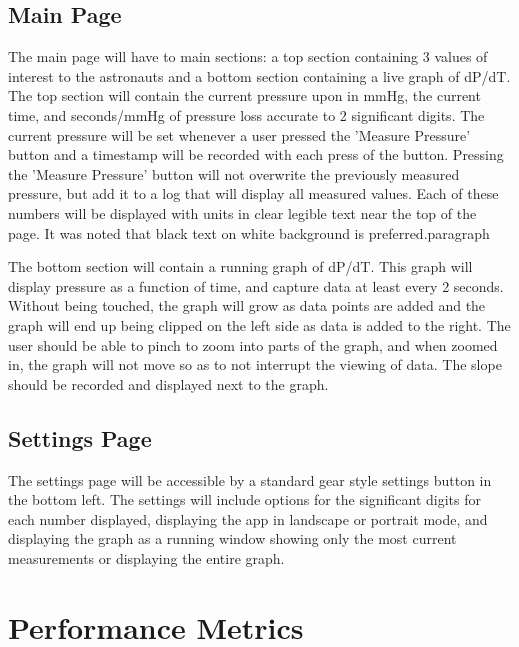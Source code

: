 \documentclass[onecolumn, draftclsnofoot,10pt, compsoc]{IEEEtran}
\begin{document}
  \subsection{Main Page}
    The main page will have to main sections: a top section containing 3 values of interest to the astronauts and a bottom section containing a live graph of dP/dT.
    The top section will contain the current pressure upon in mmHg, the current time, and seconds/mmHg of pressure loss accurate to 2 significant digits.
    The current pressure will be set whenever a user pressed the 'Measure Pressure' button and a timestamp will be recorded with each press of the button.
    Pressing the 'Measure Pressure' button will not overwrite the previously measured pressure, but add it to a log that will display all measured values.
    Each of these numbers will be displayed with units in clear legible text near the top of the page.
    It was noted that black text on white background is preferred.paragraph\par

    The bottom section will contain a running graph of dP/dT.
    This graph will display pressure as a function of time, and capture data at least every 2 seconds.
    Without being touched, the graph will grow as data points are added and the graph will end up being clipped on the left side as data is added to the right.
    The user should be able to pinch to zoom into parts of the graph, and when zoomed in, the graph will not move so as to not interrupt the viewing of data.
    The slope should be recorded and displayed next to the graph.

  \subsection{Settings Page}
  The settings page will be accessible by a standard gear style settings button in the bottom left.
  The settings will include options for the significant digits for each number displayed, displaying the app in landscape or portrait mode, and displaying the graph as a running window showing only the most current measurements or displaying the entire graph.


\section{Performance Metrics}
\end{document}

